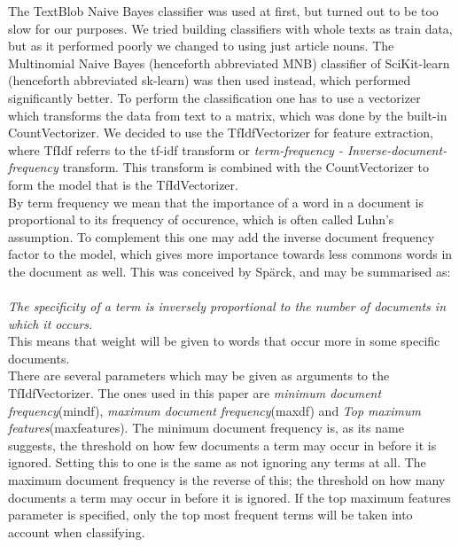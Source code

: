 \documentclass[a4paper]{article}
\begin{document}
\label{sec:sklearn}
The TextBlob Naive Bayes classifier was used at first, but turned out to be too slow for our purposes. We tried building classifiers with whole texts as train data, but as it performed poorly we changed to using just article nouns. The Multinomial Naive Bayes (henceforth abbreviated MNB) classifier of SciKit-learn (henceforth abbreviated sk-learn) was then used instead, which performed significantly better. To perform the classification one has to use a vectorizer which transforms the data from text to a matrix, which was done by the built-in CountVectorizer. We decided to use the TfIdfVectorizer for feature extraction, where TfIdf referrs to the tf-idf transform or \textit{term-frequency - Inverse-document-frequency} transform\cite{skfeatures}. This transform is combined with the CountVectorizer to form the model that is the TfIdVectorizer.\\

\noindent By term frequency we mean that the importance of a word in a document is proportional to its frequency of occurence, which is often called Luhn's assumption\cite{luhn}. To complement this one may add the inverse document frequency factor to the model, which gives more importance towards less commons words in the document as well. This was conceived by Spärck\cite{sparck}, and may be summarised as:\\
\\
\textit{The specificity of a term is inversely proportional to the number of documents in which it occurs.} \\

\noindent This means that weight will be given to words that occur more in some specific documents.\\

\noindent There are several parameters which may be given as arguments to the TfIdfVectorizer. The ones used in this paper are \textit{minimum document frequency}(min\textunderscore df), \textit{maximum document frequency}(max\textunderscore df) and \textit{Top maximum features}(max\textunderscore features).
The minimum document frequency is, as its name suggests, the threshold on how few documents a term may occur in before it is ignored. Setting this to one is the same as not ignoring any terms at all.
The maximum document frequency is the reverse of this; the threshold on how many documents a term may occur in before it is ignored. If the top maximum features parameter is specified, only the top most frequent terms will be taken into account when classifying.
\end{document}
